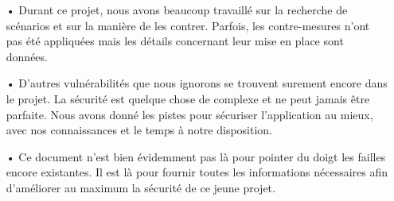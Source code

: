\begin{itemize}
\item[•] Durant ce projet, nous avons beaucoup travaillé sur la recherche de scénarios et sur la manière de les contrer. Parfois, les contre-mesures n'ont pas été appliquées mais les détails concernant leur mise en place sont données.
\item[•] D'autres vulnérabilités que nous ignorons se trouvent surement encore dans le projet. La sécurité est quelque chose de complexe et ne peut jamais être parfaite. Nous avons donné les pistes pour sécuriser l'application au mieux, avec nos connaissances et le temps à notre disposition.
\item[•] Ce document n'est bien évidemment pas là pour pointer du doigt les failles encore existantes. Il est là pour fournir toutes les informations nécessaires afin d'améliorer au maximum la sécurité de ce jeune projet.
\end{itemize}
\clearpage